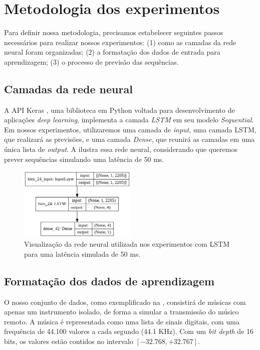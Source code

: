 \section{Metodologia dos experimentos}
\label{sec:lstm-metodology}

Para definir nossa metodologia, precisamos estabelecer seguintes passos necessários para realizar nossos experimentos: (1) como as camadas da rede neural foram organizadas; (2) a formatação dos dados de entrada para aprendizagem; (3) o processo de previsão das sequências.

\subsection{Camadas da rede neural}

A API Keras \cite{keras}, uma biblioteca em Python voltada para desenvolvimento de aplicações \textit{deep learning}, implementa a camada \textit{LSTM} em seu modelo \textit{Sequential}. Em nossos experimentos, utilizaremos uma camada de \textit{input}, uma camada LSTM, que realizará as previsões, e uma camada \textit{Dense}, que reunirá as camadas em uma única lista de \textit{output}. A  ilustra essa rede neural, considerando que queremos prever sequências simulando uma latência de 50 ms.

\begin{figure}[htbp]
    \centering
    \includegraphics[width=0.5\textwidth]{images/lstm-rnn.png}
    \caption{Visualização da rede neural utilizada nos experimentos com LSTM para uma latência simulada de 50 ms.}
    \label{fig:lstm-rnn}
\end{figure}

\subsection{Formatação dos dados de aprendizagem}
\label{subsec:input_lstm}

O nosso conjunto de dados, como exemplificado na , consistirá de músicas com apenas um instrumento isolado, de forma a simular a transmissão do músico remoto. A música é representada como uma lista de sinais digitais, com uma frequência de 44.100 valores a cada segundo (44.1 KHz). Com um \textit{bit depth} de 16 bits, os valores estão contidos no intervalo $[-32.768, +32.767]$.

